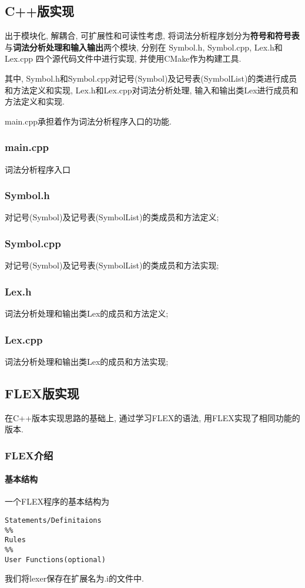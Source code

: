 \subsection{C++版实现}
出于模块化, 解耦合, 可扩展性和可读性考虑, 将词法分析程序划分为\textbf{符号和符号表}
与\textbf{词法分析处理和输入输出}两个模块, 分别在 Symbol.h, Symbol.cpp, Lex.h和Lex.cpp
四个源代码文件中进行实现, 并使用CMake作为构建工具.

其中, Symbol.h和Symbol.cpp对记号(Symbol)及记号表(SymbolList)的类进行成员和方法定义和实现,
 Lex.h和Lex.cpp对词法分析处理, 输入和输出类Lex进行成员和方法定义和实现.

main.cpp承担着作为词法分析程序入口的功能.

\subsubsection{main.cpp}
词法分析程序入口

\subsubsection{Symbol.h}
对记号(Symbol)及记号表(SymbolList)的类成员和方法定义;

\subsubsection{Symbol.cpp}
对记号(Symbol)及记号表(SymbolList)的类成员和方法实现;

\subsubsection{Lex.h}
词法分析处理和输出类Lex的成员和方法定义;

\subsubsection{Lex.cpp}
词法分析处理和输出类Lex的成员和方法实现;


\subsection{FLEX版实现}
在C++版本实现思路的基础上, 通过学习FLEX的语法, 用FLEX实现了相同功能的版本.
\subsubsection{FLEX介绍}
\paragraph{基本结构}
一个FLEX程序的基本结构为
\begin{lstlisting}
Statements/Definitaions
%%
Rules
%%
User Functions(optional)
\end{lstlisting}
我们将lexer保存在扩展名为.i的文件中.

